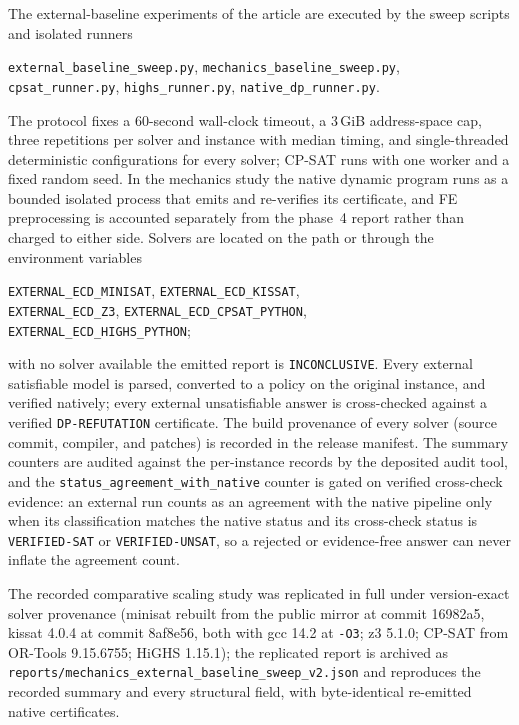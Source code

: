 The external-baseline experiments of the article are executed by the sweep
scripts and isolated runners
\begin{center}
\footnotesize
\texttt{external\_baseline\_sweep.py}, \texttt{mechanics\_baseline\_sweep.py},\\
\texttt{cpsat\_runner.py}, \texttt{highs\_runner.py},
\texttt{native\_dp\_runner.py}.
\end{center}
\noindent The protocol fixes a 60-second wall-clock timeout, a 3\,GiB
address-space cap, three repetitions per solver and instance with median
timing, and single-threaded deterministic configurations for every solver;
CP-SAT runs with one worker and a fixed random seed. In the mechanics study
the native dynamic program runs as a bounded isolated process that emits and
re-verifies its certificate, and FE preprocessing is accounted separately
from the phase~4 report rather than charged to either side. Solvers are located on the path or through the
environment variables
\begin{center}
\footnotesize
\texttt{EXTERNAL\_ECD\_MINISAT}, \texttt{EXTERNAL\_ECD\_KISSAT},\\
\texttt{EXTERNAL\_ECD\_Z3}, \texttt{EXTERNAL\_ECD\_CPSAT\_PYTHON},\\
\texttt{EXTERNAL\_ECD\_HIGHS\_PYTHON};
\end{center}
with no solver available the emitted report is \texttt{INCONCLUSIVE}. Every
external satisfiable model is parsed, converted to a policy on the original
instance, and verified natively; every external unsatisfiable answer is
cross-checked against a verified \texttt{DP-REFUTATION} certificate. The build
provenance of every solver (source commit, compiler, and patches) is recorded
in the release manifest. The summary counters are audited against the
per-instance records by the deposited audit tool, and the
\texttt{status\_agreement\_with\_native} counter is gated on verified
cross-check evidence: an external run counts as an agreement with the native
pipeline only when its classification matches the native status and its
cross-check status is \texttt{VERIFIED-SAT} or \texttt{VERIFIED-UNSAT}, so a
rejected or evidence-free answer can never inflate the agreement count.

The recorded comparative scaling study was replicated in full under
version-exact solver provenance (minisat rebuilt from the public mirror at
commit 16982a5, kissat 4.0.4 at commit 8af8e56, both with gcc 14.2 at
\texttt{-O3}; z3 5.1.0; CP-SAT from OR-Tools 9.15.6755; HiGHS 1.15.1); the
replicated report is archived as
\texttt{reports/mechanics\_external\_baseline\_sweep\_v2.json} and reproduces
the recorded summary and every structural field, with byte-identical
re-emitted native certificates.

